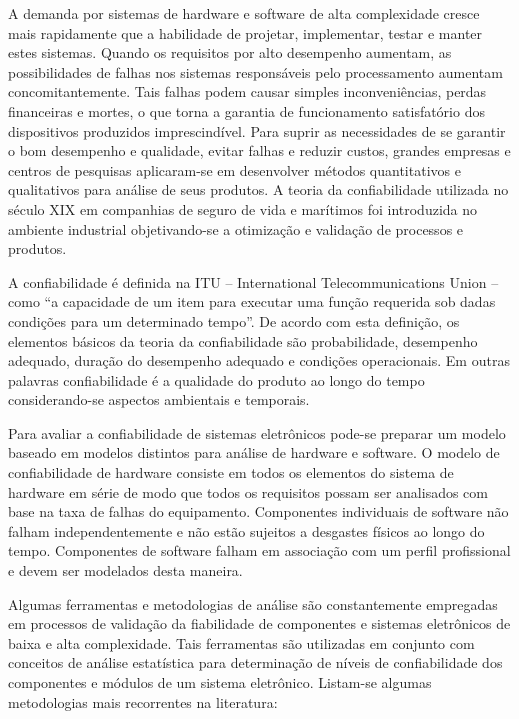 \begin{anexosenv}
A demanda por sistemas de hardware e software de alta complexidade cresce mais rapidamente que a habilidade de projetar, implementar, testar e manter estes sistemas. Quando os requisitos por alto desempenho aumentam, as possibilidades de falhas nos sistemas responsáveis pelo processamento aumentam concomitantemente. Tais falhas podem causar simples inconveniências, perdas financeiras e mortes, o que torna a garantia de funcionamento satisfatório dos dispositivos produzidos imprescindível. 
Para suprir as necessidades de se garantir o bom desempenho e qualidade, evitar falhas e reduzir custos, grandes empresas e centros de pesquisas aplicaram-se em desenvolver métodos quantitativos e qualitativos para análise de seus produtos. A teoria da confiabilidade utilizada no século XIX em companhias de seguro de vida e marítimos foi introduzida no ambiente industrial objetivando-se a otimização e validação de processos e produtos. 

A confiabilidade é definida na ITU – International Telecommunications Union – como “a capacidade de um item para executar uma função requerida sob dadas condições para um determinado tempo”. De acordo com esta definição, os elementos básicos da teoria da confiabilidade são probabilidade, desempenho adequado, duração do desempenho adequado e condições operacionais. Em outras palavras confiabilidade é a qualidade do produto ao longo do tempo considerando-se aspectos ambientais e temporais.

Para avaliar a confiabilidade de sistemas eletrônicos pode-se preparar um modelo baseado em modelos distintos para análise de hardware e software. O modelo de confiabilidade de hardware consiste em todos os elementos do sistema de hardware em série de modo que todos os requisitos possam ser analisados com base na taxa de falhas do equipamento. Componentes individuais de software não falham independentemente e não estão sujeitos a desgastes físicos ao longo do tempo. Componentes de software falham em associação com um perfil profissional e devem ser modelados desta maneira.

Algumas ferramentas e metodologias de análise são constantemente empregadas em processos de validação da fiabilidade de componentes e sistemas eletrônicos de baixa e alta complexidade. Tais ferramentas são utilizadas em conjunto com conceitos de análise estatística para determinação de níveis de confiabilidade dos componentes e módulos de um sistema eletrônico. Listam-se algumas metodologias mais recorrentes na literatura:


\end{anexosenv}
